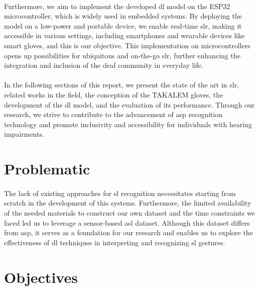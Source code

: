 \paragraph{}
Furthermore, we aim to implement the developed \ac{dl} model on the ESP32 microcontroller, which is widely used in embedded systems. By deploying the model on a low-power and portable device, we enable real-time \ac{slr}, making it accessible in various settings, including smartphones and wearable devices like smart gloves, and this is our objective. This implementation on microcontrollers opens up possibilities for ubiquitous and on-the-go \ac{slr}, further enhancing the integration and inclusion of the deaf community in everyday life.
\paragraph{}
In the following sections of this report, we present the state of the art in \ac{slr}, related works in the field, the conception of the TAKALEM gloves, the development of the \ac{dl} model, and the evaluation of its performance. Through our research, we strive to contribute to the advancement of \ac{asp} recognition technology and promote inclusivity and accessibility for individuals with hearing impairments.

\section{Problematic}
\paragraph{}
The lack of existing approaches for \ac{sl} recognition necessitates starting from scratch in the development of this systems. Furthermore, the limited availability of the needed materials to construct our own dataset and the time constraints we faced led us to leverage a sensor-based \ac{asl} dataset. Although this dataset differs from \ac{asp}, it serves as a foundation for our research and enables us to explore the effectiveness of \ac{dl} techniques in interpreting and recognizing \ac{sl} gestures.

\section{Objectives}
